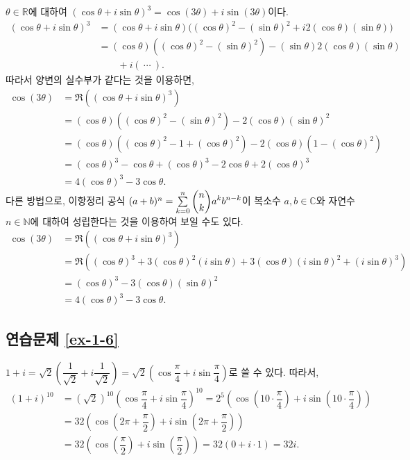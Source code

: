 $\theta\in\mathbb R$에 대하여
$(\cos\theta + i\sin\theta)^3 = \cos(3\theta) + i\sin(3\theta)$이다.
\begin{align*}
(\cos\theta + i\sin\theta)^3 
&= (\cos\theta + i\sin\theta)\Big(
(\cos\theta)^2 - (\sin\theta)^2 + i2(\cos\theta)(\sin\theta) \Big) \\
&= (\cos\theta)\left( (\cos\theta)^2 - (\sin\theta)^2 \right)
- (\sin\theta)2(\cos\theta)(\sin\theta)  \\
&\quad\quad + i(\ \cdots\ ).
\end{align*}
따라서 양변의 실수부가 같다는 것을 이용하면,
\begin{align*}
\cos(3\theta) &= \Re((\cos\theta + i\sin\theta)^3) \\
&=(\cos\theta)\left( (\cos\theta)^2 - (\sin\theta)^2 \right)
- 2(\cos\theta)(\sin\theta)^2 \\
&= (\cos\theta)\left( (\cos\theta)^2 - 1 + (\cos\theta)^2 \right)
- 2(\cos\theta)(1-(\cos\theta)^2) \\
&= (\cos\theta)^3 - \cos\theta  + (\cos\theta)^3 - 2\cos\theta + 2(\cos\theta)^3 \\
&= 4(\cos\theta)^3 - 3\cos\theta.
\end{align*}
다른 방법으로, 이항정리 공식
$(a+b)^n = \sum\limits_{k=0}^n \displaystyle{n \choose k} a^kb^{n-k}$이
복소수 $a,b \in \mathbb C$와 자연수 $n\in \mathbb N$에 대하여
성립한다는 것을 이용하여 보일 수도 있다.
\begin{align*}
\cos(3\theta) &= \Re((\cos\theta + i\sin\theta)^3) \\
&= \Re ( (\cos\theta)^3 + 3(\cos\theta)^2(i\sin\theta) 
+ 3(\cos\theta)(i\sin\theta)^2 + (i\sin\theta)^3) \\
&= (\cos\theta)^3 - 3(\cos\theta)(\sin\theta)^2 \\
&= 4(\cos\theta)^3 - 3\cos\theta.
\end{align*}

\subsection*{연습문제 \ref{ex-1-6}}

$1+i = \sqrt{2}\left(\dfrac1{\sqrt{2}} + i\dfrac1{\sqrt{2}}\right)
= \sqrt{2}\left( \cos\dfrac\pi4 + i\sin \dfrac\pi4 \right)$로 쓸 수 있다.
따라서,
\begin{align*}
(1+i)^{10}
&= (\sqrt{2})^{10} \left( \cos\dfrac\pi4 + i\sin \dfrac\pi4 \right)^{10}
= 2^5 \left( \cos\left(10\cdot \dfrac\pi4\right) 
+ i\sin \left(10\cdot \dfrac\pi4\right) \right) \\
&= 32 \left( \cos\left(2\pi+\dfrac\pi2\right) 
+ i\sin \left(2\pi+\dfrac\pi2\right) \right) \\
&=32 \left( \cos\left(\dfrac\pi2\right) + i\sin \left(\dfrac\pi2\right) \right) 
= 32(0+i\cdot 1) = 32i.
\end{align*}

